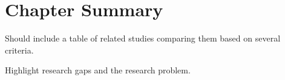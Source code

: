 \begin{comment}

%
%
Guide on Writing your RRL chapter

1. Identify the keywords with respect to your research
      One keyword = One document section
                Examples: 2.1 Story Generation Systems
			 2.2 Knowledge Representation

2.  Find references using these keywords

3.  For each of the references that you find,
        Check: Is it relevant to your research?
        Use their references to find more relevant works.

4. Identify a set of criteria for comparison.
       It will serve as a guide to help you focus on what to look for

5. Write a summary focusing on -
       What: A short description of the work
       How: A summary of the approach it utilized
       Findings: If applicable, provide the results
        Why: Relevance to your work

6. At the end of each section,  show a Table of Comparison of the related works
   and your proposed project/system

\end{comment}
\section{Chapter Summary}
Should include a table of related studies comparing them based on several criteria.

Highlight research gaps and the research problem.

